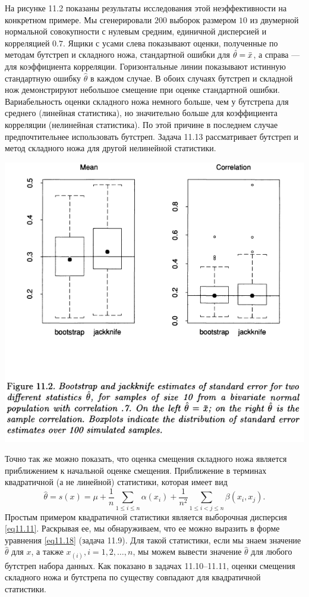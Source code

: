 На рисунке 11.2 показаны результаты исследования этой неэффективности на конкретном примере. Мы сгенерировали $200$ выборок размером $10$ из двумерной нормальной совокупности с нулевым средним, единичной дисперсией и корреляцией $0.7$. Ящики с усами слева показывают оценки, полученные по методам бутстреп и складного ножа, стандартной ошибки для $\hat{\theta} = \Bar{x}$, а справа --- для коэффициента корреляции. Горизонтальные линии показывают истинную стандартную ошибку $\hat{\theta}$ в каждом случае. В обоих случаях бутстреп и складной нож демонстрируют небольшое смещение при оценке стандартной ошибки. Вариабельность оценки складного ножа немного больше, чем у бутстрепа для среднего (линейная статистика), но значительно больше для коэффициента корреляции (нелинейная статистика). По этой причине в последнем случае предпочтительнее использовать бутстреп. Задача 11.13 рассматривает бутстреп и  метод складного ножа для другой нелинейной статистики.

\noindent
\includegraphics[width=\linewidth]{11/f11.2.png}
\newline

Точно так же можно показать, что оценка смещения складного ножа является приближением к начальной оценке смещения. Приближение в терминах квадратичной (а не линейной) статистики, которая имеет вид
\begin{equation}\label{eq11.18}
    \hat{\theta} = s(x) = \mu + \frac{1}{n}\sum\limits_{1 \leq i \leq n}\alpha(x_i) + \frac{1}{n^2}\sum\limits_{1 \leq i < j \leq n}\beta(x_i, x_j).
\end{equation}
Простым примером квадратичной статистики является выборочная дисперсия \ref{eq11.11}. Раскрывая ее, мы обнаруживаем, что ее можно выразить в форме уравнения \ref{eq11.18} (задача 11.9). Для такой статистики, если мы знаем значение $\hat{\theta}$ для $x$, а также $x_{(i)}, i = 1,2, \dots, n$, мы можем вывести значение $\hat{\theta}$ для любого бутстреп набора данных. Как показано в задачах 11.10–11.11, оценки смещения складного ножа и бутстрепа по существу совпадают для квадратичной статистики.